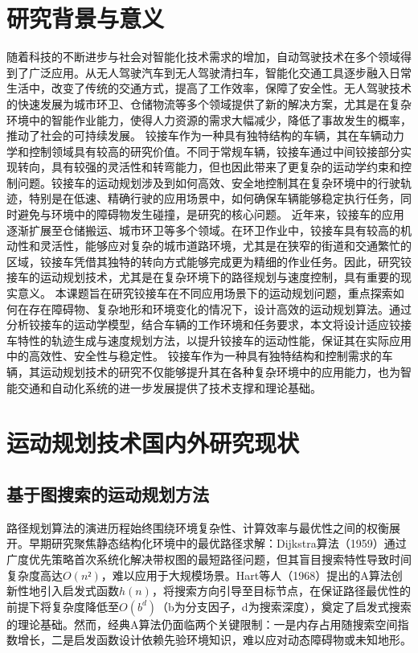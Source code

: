 \documentclass[master,academic]{ysuthesis} %
\begin{document}
	\section{研究背景与意义}
	随着科技的不断进步与社会对智能化技术需求的增加，自动驾驶技术在多个领域得到了广泛应用。从无人驾驶汽车到无人驾驶清扫车，智能化交通工具逐步融入日常生活中，改变了传统的交通方式，提高了工作效率，保障了安全性。无人驾驶技术的快速发展为城市环卫、仓储物流等多个领域提供了新的解决方案，尤其是在复杂环境中的智能作业能力，使得人力资源的需求大幅减少，降低了事故发生的概率，推动了社会的可持续发展。
	铰接车作为一种具有独特结构的车辆，其在车辆动力学和控制领域具有较高的研究价值。不同于常规车辆，铰接车通过中间铰接部分实现转向，具有较强的灵活性和转弯能力，但也因此带来了更复杂的运动学约束和控制问题。铰接车的运动规划涉及到如何高效、安全地控制其在复杂环境中的行驶轨迹，特别是在低速、精确行驶的应用场景中，如何确保车辆能够稳定执行任务，同时避免与环境中的障碍物发生碰撞，是研究的核心问题。
	近年来，铰接车的应用逐渐扩展至仓储搬运、城市环卫等多个领域。在环卫作业中，铰接车具有较高的机动性和灵活性，能够应对复杂的城市道路环境，尤其是在狭窄的街道和交通繁忙的区域，铰接车凭借其独特的转向方式能够完成更为精细的作业任务。因此，研究铰接车的运动规划技术，尤其是在复杂环境下的路径规划与速度控制，具有重要的现实意义。
	本课题旨在研究铰接车在不同应用场景下的运动规划问题，重点探索如何在存在障碍物、复杂地形和环境变化的情况下，设计高效的运动规划算法。通过分析铰接车的运动学模型，结合车辆的工作环境和任务要求，本文将设计适应铰接车特性的轨迹生成与速度规划方法，以提升铰接车的运动性能，保证其在实际应用中的高效性、安全性与稳定性。
	铰接车作为一种具有独特结构和控制需求的车辆，其运动规划技术的研究不仅能够提升其在各种复杂环境中的应用能力，也为智能交通和自动化系统的进一步发展提供了技术支撑和理论基础。
	\section{运动规划技术国内外研究现状}
		\subsection{基于图搜索的运动规划方法}
		路径规划算法的演进历程始终围绕环境复杂性、计算效率与最优性之间的权衡展开。早期研究聚焦静态结构化环境中的最优路径求解：Dijkstra算法（1959）通过广度优先策略首次系统化解决带权图的最短路径问题，但其盲目搜索特性导致时间复杂度高达$O(n²)$，难以应用于大规模场景。Hart等人（1968）提出的A算法创新性地引入启发式函数$h(n)$，将搜索方向引导至目标节点，在保证路径最优性的前提下将复杂度降低至$O(b^d)$（b为分支因子，d为搜索深度），奠定了启发式搜索的理论基础。然而，经典A算法仍面临两个关键限制：一是内存占用随搜索空间指数增长，二是启发函数设计依赖先验环境知识，难以应对动态障碍物或未知地形。
\end{document}
